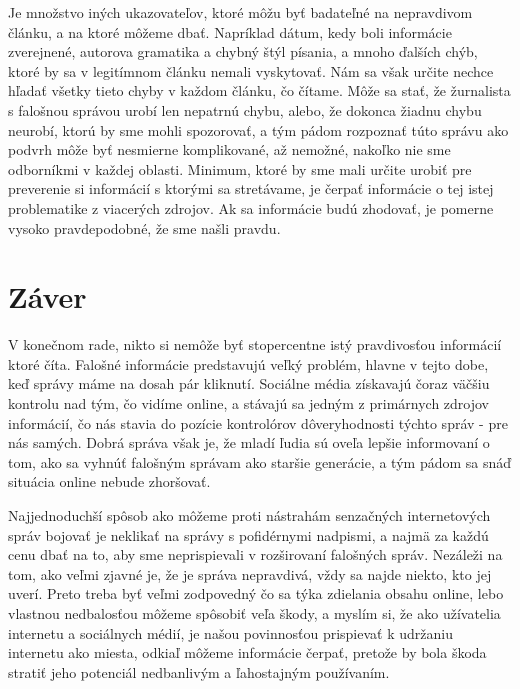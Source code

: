 \documentclass{sig-alternate}
\begin{document}
Je množstvo iných ukazovateľov, ktoré môžu byť badateľné na nepravdivom článku, a na ktoré môžeme dbať. Napríklad dátum, kedy boli informácie zverejnené, autorova gramatika a chybný štýl písania, a mnoho ďalších chýb, ktoré by sa v legitímnom článku nemali vyskytovať. \cite{f} Nám sa však určite nechce hľadať všetky tieto chyby v každom článku, čo čítame. Môže sa stať, že žurnalista s falošnou správou urobí len nepatrnú chybu, alebo, že dokonca žiadnu chybu neurobí, ktorú by sme mohli spozorovať, a tým pádom rozpoznať túto správu ako podvrh môže byť nesmierne komplikované, až nemožné, nakoľko nie sme odborníkmi v každej oblasti. Minimum, ktoré by sme mali určite urobiť pre preverenie si informácií s ktorými sa stretávame, je čerpať informácie o tej istej problematike z viacerých zdrojov. Ak sa informácie budú zhodovať, je pomerne vysoko pravdepodobné, že sme našli pravdu. 
\section{Záver}
V konečnom rade, nikto si nemôže byť stopercentne istý pravdivosťou informácií ktoré číta. Falošné informácie predstavujú veľký problém, hlavne v tejto dobe, keď správy máme na dosah pár kliknutí. Sociálne média získavajú čoraz väčšiu kontrolu nad tým, čo vidíme online, a stávajú sa jedným z primárnych zdrojov informácií, čo nás stavia do pozície kontrolórov dôveryhodnosti týchto správ - pre nás samých. Dobrá správa však je, že mladí ľudia sú oveľa lepšie informovaní o tom, ako sa vyhnúť falošným správam ako staršie generácie, a tým pádom sa snáď situácia online nebude zhoršovať. 

Najjednoduchší spôsob ako môžeme proti nástrahám senzačných internetových správ bojovať je neklikať na správy s pofidérnymi nadpismi, a najmä za každú cenu dbať na to, aby sme neprispievali v rozširovaní falošných správ. Nezáleži na tom, ako veľmi zjavné je, že je správa nepravdivá, vždy sa najde niekto, kto jej uverí. Preto treba byť veľmi zodpovedný čo sa týka zdielania obsahu online, lebo vlastnou nedbalosťou môžeme spôsobiť veľa škody, a myslím si, že ako užívatelia internetu a sociálnych médií, je našou povinnosťou prispievať k udržaniu internetu ako miesta, odkiaľ môžeme informácie čerpať, pretože by bola škoda stratiť jeho potenciál nedbanlivým a ľahostajným používaním.






\balancecolumns
\end{document}
